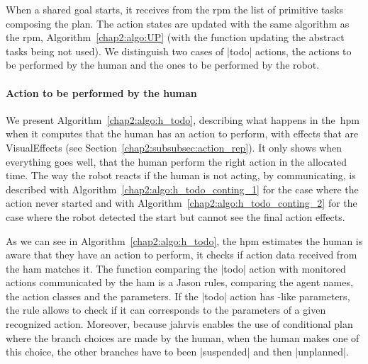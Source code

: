 \documentclass[a4paper,11pt,twoside]{StyleThese}
\begin{document}
When a shared goal starts, it receives from the \acrshort{rpm} the list of primitive tasks composing the plan. The action states are updated with the same algorithm as the \acrshort{rpm}, Algorithm~\ref{chap2:algo:UP} (with the function updating the abstract tasks being not used). We distinguish two cases of |todo| actions, the actions to be performed by the human and the ones to be performed by the robot.

\paragraph{Action to be performed by the human} We present Algorithm~\ref{chap2:algo:h_todo}, describing what happens in the~\acrshort{hpm} when it computes that the human has an action to perform, with effects that are VisualEffects (see Section~\ref{chap2:subsubsec:action_rep}). It only shows when everything goes well, \ie that the human perform the right action in the allocated time. The way the robot reacts if the human is not acting, by communicating, is described with Algorithm~\ref{chap2:algo:h_todo_conting_1} for the case where the action never started and with Algorithm~\ref{chap2:algo:h_todo_conting_2} for the case where the robot detected the start but cannot see the final action effects.

As we can see in Algorithm~\ref{chap2:algo:h_todo}, the \acrshort{hpm} estimates the human is aware that they have an action to perform, it checks if action data received from the \acrlong{ham} matches it. The function comparing the |todo| action with monitored actions communicated by the \acrshort{ham} is a Jason rules, comparing the agent names, the action classes and the parameters. If the |todo| action has \sparql-like parameters, the rule allows to check if it can corresponds to the parameters of a given recognized action. Moreover, because \acrshort{jahrvis} enables the use of conditional plan where the branch choices are made by the human, when the human makes one of this choice, the other branches have to been |suspended| and then |unplanned|.
\end{document}
